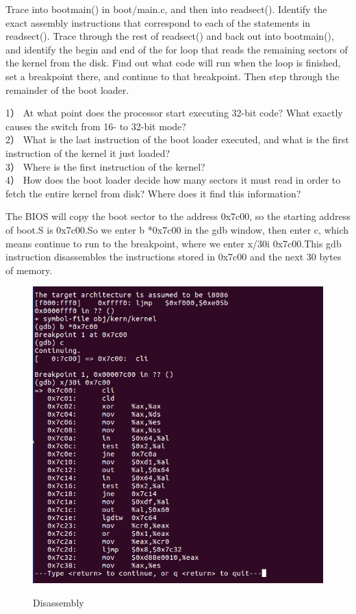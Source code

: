 Trace into bootmain() in boot/main.c, and then into readsect(). Identify the exact assembly instructions that correspond to each of the statements in readsect(). Trace through the rest of readsect() and back out into bootmain(), and identify the begin and end of the for loop that reads the remaining sectors of the kernel from the disk. Find out what code will run when the loop is finished, set a breakpoint there, and continue to that breakpoint. Then step through the remainder of the boot loader.
\begin{flushleft}
1） At what point does the processor start executing 32-bit code? What exactly causes the switch from 16- to 32-bit mode?\\
2） What is the last instruction of the boot loader executed, and what is the first instruction of the kernel it just loaded?\\
3） Where is the first instruction of the kernel?\\
4） How does the boot loader decide how many sectors it must read in order to fetch the entire kernel from disk? Where does it find this
information?\\
\end{flushleft}

The BIOS will copy the boot sector to the address 0x7c00, so the starting address of boot.S is 0x7c00.So we enter b *0x7c00 in the gdb window, then enter c, which means continue to run to the breakpoint, where we enter x/30i 0x7c00.This gdb instruction disassembles the instructions stored in 0x7c00 and the next 30 bytes of memory.
\begin{figure}[H]
  \centering
  \includegraphics[width=0.8\linewidth]{figure/set_breakpoint}\\
  \caption{Disassembly}\label{2}
\end{figure}


